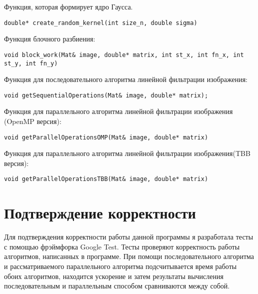 \documentclass{report}
\begin{document}
\par Функция, которая формирует ядро Гаусса.
\begin{lstlisting}
double* create_random_kernel(int size_n, double sigma)
\end{lstlisting}
\par Функция блочного разбиения:
\begin{lstlisting}
void block_work(Mat& image, double* matrix, int st_x, int fn_x, int st_y, int fn_y)
\end{lstlisting}
\par Функция для последовательного алгоритма линейной фильтрации изображения:
\begin{lstlisting}
void getSequentialOperations(Mat& image, double* matrix);
\end{lstlisting}
\par Функция для параллельного алгоритма линейной фильтрации изображения (OpenMP версия):
\begin{lstlisting}
void getParallelOperationsOMP(Mat& image, double* matrix)
\end{lstlisting}
\par Функция для параллельного алгоритма линейной фильтрации изображения(TBB версия):
\begin{lstlisting}
void getParallelOperationsTBB(Mat& image, double* matrix)
\end{lstlisting}
\newpage

\section*{Подтверждение корректности}
Для подтверждения корректности работы данной программы я разработала тесты с помощью фрэймфорка Google Test. Тесты проверяют корректность работы алгоритмов, написанных в программе. При помощи последовательного алгоритма и рассматриваемого параллельного алгоритма подсчитывается время работы обоих алгоритмов, находится ускорение и затем результаты вычисления  последовательным и параллельным способом сравниваются между собой.
\newpage

\end{document}
